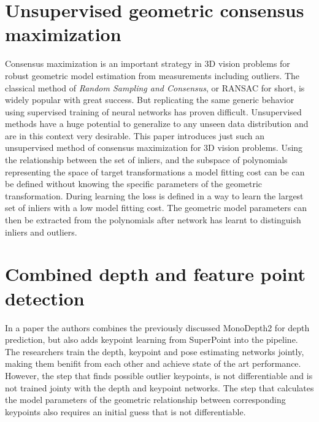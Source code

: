 \section{Unsupervised geometric consensus maximization}

Consensus maximization is an important strategy in 3D vision problems for robust geometric model estimation from measurements including outliers. The classical method of \textit{Random Sampling and Consensus}, or RANSAC\cite{ransac} for short, is widely popular with great success. But replicating the same generic behavior using supervised training of neural networks has proven difficult. Unsupervised methods have a huge potential to generalize to any unseen data distribution and are in this context very desirable. This paper\cite{consensus} introduces just such an unsupervised method of consensus maximization for 3D vision problems. Using the relationship between the set of inliers, and the subspace of polynomials representing the space of target transformations a model fitting cost can be can be defined without knowing the specific parameters of the geometric transformation. During learning the loss is defined in a way to learn the largest set of inliers with a low model fitting cost. The geometric model parameters can then be extracted from the polynomials after network has learnt to distinguish inliers and outliers.

\section{Combined depth and feature point detection}

In a paper\cite{keypointdepth} the authors combines the previously discussed MonoDepth2\cite{monodepth2} for depth prediction, but also adds keypoint learning from SuperPoint\cite{superpoint} into the pipeline. The researchers train the depth, keypoint and pose estimating networks jointly, making them benifit from each other and achieve state of the art performance.  However, the step that finds possible outlier keypoints, is not differentiable and is not trained jointy with the depth and keypoint networks. The step that calculates the model parameters of the geometric relationship between corresponding keypoints also requires an initial guess that is not differentiable.

